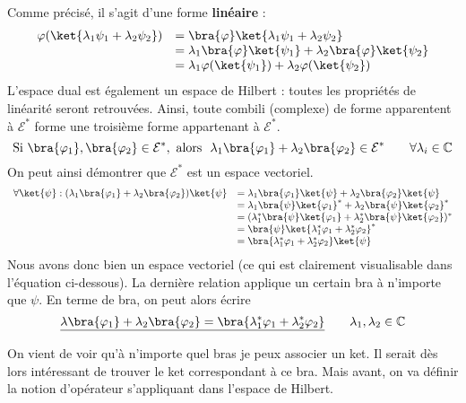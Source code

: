 Comme précisé, il s'agit d'une forme \textbf{linéaire} :
\begin{equation}
\begin{array}{ll}
\varphi(\ket{\lambda_1\psi_1+\lambda_2\psi_2}) &= \bra{\varphi}\ket{\lambda_1\psi_1+\lambda_2\psi_2}\\
&= \lambda_1\bra{\varphi}\ket{\psi_1}+\lambda_2\bra{\varphi}\ket{\psi_2}\\
&= \lambda_1\varphi(\ket{\psi_1})+\lambda_2\varphi(\ket{\psi_2})
\end{array}
\end{equation}
L'espace dual est également un espace de Hilbert : toutes les propriétés de 
linéarité seront retrouvées. Ainsi, toute combili (complexe) de forme 
apparentent à $\mathcal{E}^*$ forme une troisième forme appartenant à 
$\mathcal{E}^*$.
\begin{equation}
\text{Si } \bra{\varphi_1},\bra{\varphi_2}\in\mathcal{E}^*, \text{ alors }\ 
\lambda_1\bra{\varphi_1} + \lambda_2\bra{\varphi_2} \in\mathcal{E}^*\qquad 
\forall \lambda_i\in\mathbb{C}
\end{equation}
On peut ainsi démontrer que $\mathcal{E}^*$ est un espace vectoriel.
\begin{equation}
\begin{array}{ll}
\forall \ket{\psi} : (\lambda_1\bra{\varphi_1} + \lambda_2\bra{\varphi_2})\ket{\psi} 
&= \lambda_1\bra{\varphi_1}\ket{\psi}+\lambda_2\bra{\varphi_2}\ket{\psi} \\
&= \lambda_1\bra{\psi}\ket{\varphi_1}^*+\lambda_2\bra{\psi}\ket{\varphi_2}^*\\
&= (\lambda_1^*\bra{\psi}\ket{\varphi_1}+\lambda_2^*\bra{\psi}\ket{\varphi_2})^*\\
&= \bra{\psi}\ket{\lambda_1^*\varphi_1+\lambda_2^*\varphi_2}^*\\
&= \bra{\lambda_1^*\varphi_1+\lambda_2^*\varphi_2}\ket{\psi}
\end{array}
\end{equation}
Nous avons donc bien un espace vectoriel (ce qui est clairement visualisable 
dans l'équation ci-dessous). La dernière relation applique un certain bra à 
n'importe que $\psi$. En terme de bra, on peut alors écrire
\begin{equation}
\underline{\lambda\bra{\varphi_1} + \lambda_2\bra{\varphi_2} = \bra{\lambda_1^*\varphi_1
+\lambda_2^*\varphi_2}}\qquad \lambda_1,\lambda_2\in\mathbb{C}
\end{equation}


On vient de voir qu'à n'importe quel bras je peux associer un ket. Il serait 
dès lors intéressant de trouver le ket correspondant à ce bra. Mais avant, on va définir 
la notion d'opérateur s'appliquant dans l'espace de Hilbert. \\

